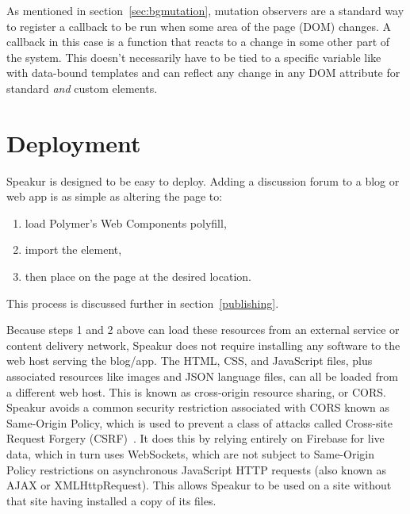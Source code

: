 As mentioned in section~\ref{sec:bgmutation}, 
mutation observers are a standard way to register a callback to be run when some area of the page (DOM) changes. 
A callback in this case is a function that reacts to a change in some other part of the system.
This doesn't necessarily have to be tied to a specific variable like with data-bound templates and can reflect any change in any DOM attribute for standard \textit{and} custom elements. 

\section{Deployment}
Speakur is designed to be easy to deploy.
Adding a discussion forum to a blog or web app is as simple as altering the page to:

\begin{enumerate}
\item load Polymer's Web Components polyfill,
\item import the  element,
\item then place  on the page at the desired location.
\end{enumerate}

This process is discussed further in section~\ref{publishing}. 

Because steps 1 and 2 above can load these resources from an external service or content delivery network,
Speakur does not require installing any software to the web host serving the blog/app.
The HTML, CSS, and JavaScript files, plus associated resources like images and JSON language files, 
can all be loaded from a different web host. 
This is known as cross-origin resource sharing, or CORS.
Speakur avoids a common security restriction associated with CORS known as Same-Origin Policy, which is used to prevent a class of attacks called Cross-site Request Forgery (CSRF)~\cite{mozillacontributors2015-b}.
It does this by relying entirely on Firebase for live data,
which in turn uses WebSockets,
which are not subject to Same-Origin Policy restrictions on asynchronous JavaScript HTTP requests (also known as AJAX or XMLHttpRequest).
This allows Speakur to be used on a site without that site having installed a copy of its files.

